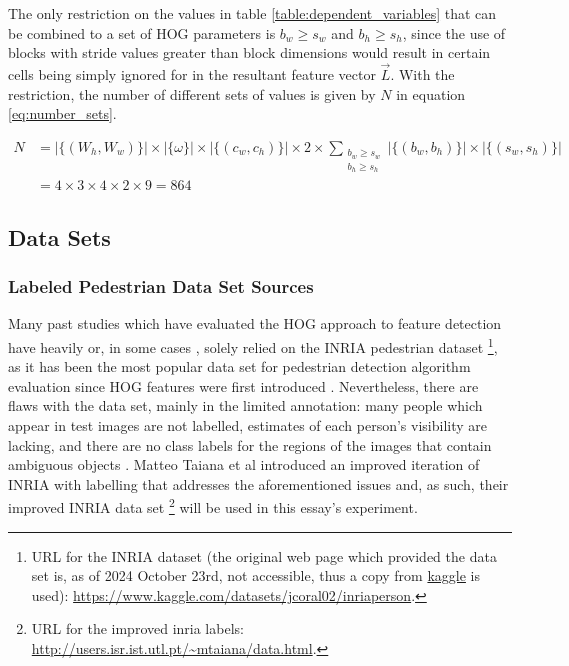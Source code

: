 The only restriction on the values in table \ref{table:dependent_variables} that can be combined to a set of HOG parameters is $b_w\ge s_w$ and $b_h\ge s_h$, since the use of blocks with stride values greater than block dimensions would result in certain cells being simply ignored for in the resultant feature vector $\vec{L}$. With the restriction, the number of different sets of values is given by $N$ in equation \ref{eq:number_sets}.

\begin{equation}\label{eq:number_sets}
\begin{split}
N &= |\{(W_h, W_w)\}| \times |\{\omega\}| \times |\{(c_w, c_h)\}| \times 2 \times \sum_{\substack{b_w \geq s_w \\ b_h \geq s_h}} |\{(b_w, b_h)\}| \times |\{(s_w, s_h)\}|  \\
&= 4 \times 3 \times 4 \times 2 \times 9  =864
\end{split}
\end{equation}

\subsection{Data Sets}

\subsubsection{Labeled Pedestrian Data Set Sources}

Many past studies which have evaluated the HOG approach to feature detection have heavily \cite{piotrdollr_2012_crosstalk} or, in some cases \cite{zhou_2021_research}, solely relied on the INRIA pedestrian dataset \footnote{URL for the INRIA dataset (the original web page which provided the data set is, as of 2024 October 23rd, not accessible, thus a copy from \href{kaggle.com}{kaggle} is used): \url{https://www.kaggle.com/datasets/jcoral02/inriaperson}.}, as it has been the most popular data set for pedestrian detection algorithm evaluation \cite{dollar_2012_pedestrian} since HOG features were first introduced \cite{dalal_2005_histograms}. Nevertheless, there are flaws with the data set, mainly in the limited annotation: many people which appear in test images are not labelled, estimates of each person’s visibility are lacking, and there are no class labels for the regions of the images that contain ambiguous objects \cite{inria_improved}. Matteo Taiana et al introduced an improved iteration of INRIA with labelling that addresses the aforementioned issues and, as such, their improved INRIA data set \footnote{URL for the improved inria labels: \url{http://users.isr.ist.utl.pt/~mtaiana/data.html}.} will be used in this essay's experiment.

